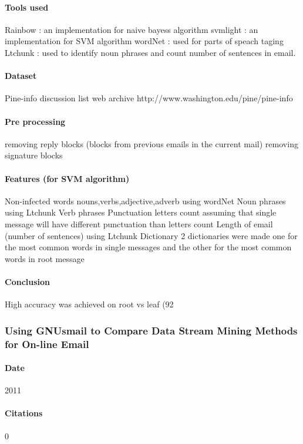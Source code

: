 \documentclass[12pt]{article}
\begin{document}
\paragraph{Tools used}
Rainbow : an implementation for naive bayess algorithm
svmlight : an implementation for SVM algorithm
wordNet : used for parts of speach taging
Ltchunk : used to identify noun phrases and count number of sentences in email.

\paragraph{Dataset}
Pine-info discussion list web archive
http://www.washington.edu/pine/pine-info

\paragraph{Pre processing}
removing reply blocks (blocks from previous emails in the current mail)
removing signature blocks

\paragraph{Features (for SVM algorithm)}
Non-infected words
nouns,verbs,adjective,adverb
using wordNet
Noun phrases
using Ltchunk
Verb phrases
Punctuation letters count
assuming that single message will have different punctuation than letters count
Length of email (number of sentences)
using Ltchunk
Dictionary
2 dictionaries were made one for the most common words in single messages and the other for the most common words in root message

\paragraph{Conclusion}
High accuracy was achieved on root vs leaf (92%



\subsubsection{Using GNUsmail to Compare Data Stream Mining Methods for On-line Email}
\paragraph{Date} 2011

\paragraph{Citations} 0
\end{document}
